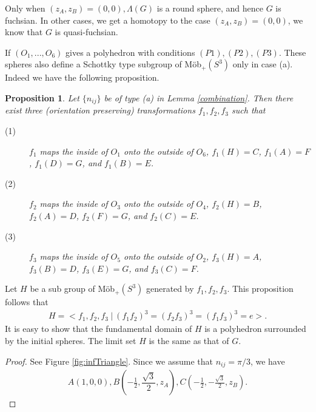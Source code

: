\documentclass[suppldata, dvipdfmx]{interact}
\theoremstyle{plain}%
\newtheorem{proposition}[theorem]{Proposition}
\theoremstyle{definition}
\theoremstyle{remark}
\theoremstyle{problemstyle}
\begin{document}
Only when $(z_A, z_B) =(0, 0), \Lambda(G)$ is a round sphere, and hence
$G$ is fuchsian. In other cases, we get a homotopy to the case 
$(z_A, z_B) = (0, 0)$, we know that $G$ is quasi-fuchsian.


If $(O_1, ..., O_6)$ gives a polyhedron with conditions
$(P1), (P2), (P3)$.
These spheres also define a Schottky type subgroup of M\"ob$_+(S^3)$ 
only in case (a). Indeed we have the following  proposition.

\begin{proposition}
Let $\{n_{ij}\}$ be of type (a) in Lemma \ref{combination}. Then there exist three
 (orientation preserving) transformations $f_1, f_2, f_3$ such that
 \begin{description}
  \item[(1)] $f_1$ maps the inside of $O_1$ onto the outside of
             $O_6$, $f_1(H) = C$, $f_1(A) = F$,  $f_1(D) = G$, and
             $f_1(B) = E$.
  \item[(2)] $f_2$ maps the inside of $O_3$ onto the outside of
             $O_4$, $f_2(H) = B$, $f_2(A) = D$,  $f_2(F) = G$, and
             $f_2(C) = E$.             
  \item[(3)] $f_3$ maps the inside of $O_5$ onto the outside of
             $O_2$, $f_3(H) = A$, $f_3(B) = D$,  $f_3(E) = G$, and
             $f_3(C) = F$.
\end{description}
\end{proposition}

Let $H$ be a sub group of M\"ob$_+(S^3)$ generated by $f_1, f_2,
f_3$. This proposition follows that
\begin{align*}
 H = <f_1, f_2, f_3~|~(f_1f_2)^3 = (f_2f_3)^3 = (f_1f_3)^3 = e>.
\end{align*}
It is easy to show that the fundamental domain of $H$ is a polyhedron
surrounded by the initial spheres. The limit set $H$ is the same as that
of $G$.

\begin{proof}
See Figure \ref{fig:infTriangle}. Since we assume that $n_{ij} = \pi/3$, we have
\begin{align*}
 A(1, 0, 0), B(-\frac{1}{2}, \dfrac{\sqrt{3}}{2}, z_A), C(-\frac{1}{2}, -\frac{\sqrt{3}}{2}, z_B).
\end{align*}
\end{proof}
\end{document}

